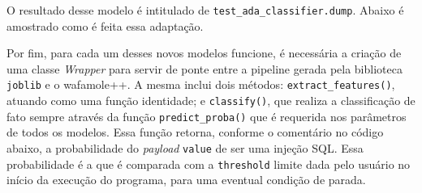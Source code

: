 O resultado desse modelo é intitulado de \verb+test_ada_classifier.dump+. Abaixo é amostrado como é feita essa adaptação.

\label{sec:codigos:modelos}
\bigskip

Por fim, para cada um desses novos modelos funcione, é necessária a criação de uma classe \textit{Wrapper} para servir de ponte entre a pipeline gerada pela biblioteca \verb+joblib+ e o wafamole++. A mesma inclui dois métodos: \verb+extract_features()+, atuando como uma função identidade; e \verb+classify()+, que realiza a classificação de fato sempre através da função \verb+predict_proba()+ que é requerida nos parâmetros de todos os modelos. Essa função retorna, conforme o comentário no código abaixo, a probabilidade do \textit{payload} \verb+value+ de ser uma injeção SQL. Essa probabilidade é a que é comparada com a \verb+threshold+ limite dada pelo usuário no início da execução do programa, para uma eventual condição de parada.

\label{sec:codigos:modelos}
\bigskip



